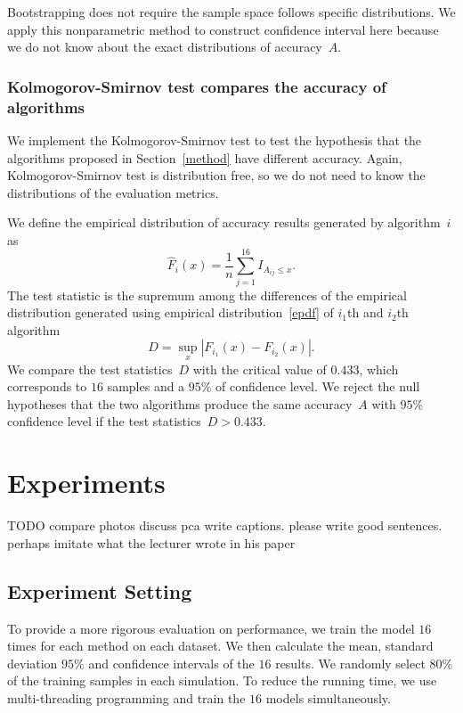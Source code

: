 \documentclass[12pt]{article} %
\begin{document}
Bootstrapping does not require the sample space follows specific distributions. We apply this nonparametric method to construct confidence interval here because we do not know about the exact distributions of accuracy~$A$.

\subsubsection{Kolmogorov-Smirnov test compares the accuracy of algorithms}\label{sec:ks}
We implement the Kolmogorov-Smirnov test to test the hypothesis that the algorithms proposed in Section~\ref{method} have different accuracy.  Again, Kolmogorov-Smirnov test is distribution free, so we do not need to know the distributions of the evaluation metrics.

We define the empirical distribution of accuracy results generated by algorithm~$i$ as
\begin{equation}\label{epdf}
  \hat{F}_{i}(x)=\frac{1}{n}\sum_{j=1}^{16}I_{A_{ij} \leq x}.
\end{equation}
The test statistic is the supremum among the differences of the empirical distribution generated using empirical distribution~\eqref{epdf} of $i_1$th and $i_2$th algorithm \citep{Walck:1996cca}
\begin{equation}\label{teststatistic}
D=\sup _{x}\left|F_{i_1}(x)-F_{i_2}(x)\right|.
\end{equation}
We compare the test statistics~$D$ with the critical value of $0.433$, which corresponds to $16$ samples and a $95\%$ of confidence level. We reject the null hypotheses that the two algorithms produce the same accuracy~$A$ with $95\%$ confidence level if the test statistics~$D>0.433$.
\section{Experiments}\label{result}
{\color{red} TODO compare photos
discuss pca
write captions.
please write good sentences.
perhaps imitate what the lecturer wrote in his paper}
\subsection{Experiment Setting}
To provide a more rigorous evaluation on performance, we train the model $16$ times for each method on each dataset. We then calculate the mean, standard deviation $95\%$ and confidence intervals of the $16$ results.
We randomly select $80\%$ of the training samples in each simulation.
To reduce the running time, we use multi-threading programming and train the $16$ models simultaneously. 
\end{document}
